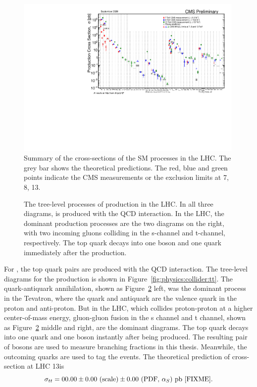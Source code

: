 \begin{figure}[ht]
    \centering
    \includegraphics[width=0.99\textwidth]{chapters/Physics/sectionPPCollision/figures/SigmaNew_v0.pdf}
    \caption{Summary of the cross-sections of the SM processes in the LHC. The grey bar shows the theoretical predictions. The red, blue and green points indicate the CMS measurements or the exclusion limits at 7, 8, 13\TeV.}
    \label{fig:physics:ppCollision:hardxs}
\end{figure}



\begin{figure}[ht]
    \centering
    
    \caption{The tree-level processes of \ttbar production in the LHC. In all three diagrams, \ttbar is produced with the QCD interaction. In the LHC, the dominant production processes are the two diagrams on the right, with two incoming gluons colliding in the s-channel and t-channel, respectively. The top quark decays into one \PW boson and one \PQb quark immediately after the production.}
    \label{fig:physics:ppCollision:tt}
\end{figure}
\noindent For \ttbar, the top quark pairs are produced with the QCD interaction. The tree-level diagrams for the \ttbar production is shown in Figure~\ref{fig:physics:collider:tt}. The quark-antiquark annihilation, shown as Figure~\ref{fig:physics:ppCollision:tt} left, was the dominant process in the Tevatron, where the quark and antiquark are the valence quark in the proton and anti-proton. But in the LHC, which collides proton-proton at a higher center-of-mass energy, gluon-gluon fusion in the s channel and t channel, shown as  Figure~\ref{fig:physics:ppCollision:tt} middle and right, are the dominant diagrams. The top quark decays into one \PQb quark and one \PW boson instantly after being produced. The resulting pair of \PW bosons are used to measure \PW branching fractions in this thesis. Meanwhile, the outcoming \PQb quarks are used to tag the \ttbar events. The theoretical prediction of \ttbar cross-section at LHC 13\TeV is
\begin{equation}
    \sigma_{tt} = 00.00 \pm 0.00 \text{~(scale)} \pm 0.00 \text{~(PDF, \ensuremath{\alpha_S})~pb [FIXME]} .
\end{equation}



